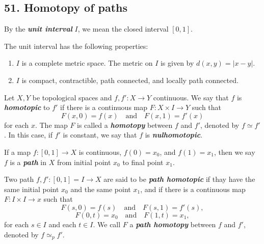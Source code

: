 \subsection{51. Homotopy of paths}

\begin{mydefinition}
By the \textbf{\emph{unit interval}} $I$, we mean the closed interval $[0,1]$. 
\end{mydefinition}

\begin{mytheorem}
The unit interval has the following properties:
\begin{enumerate}[label={(\alph*)}]
\item $I$ is a complete metric space. The metric on $I$ is given by $d(x,y)=|x-y|$.
\item $I$ is compact, contractible, path connected, and locally path connected.
\end{enumerate}
\end{mytheorem}

\begin{mydefinition}
[Homotopic]
Let $X,Y$ be topological spaces and $f,f':X\to Y$ continuous. We say that $f$ is \textbf{\emph{homotopic}} to $f'$ if there is a continuous map $F:X\times I\to Y$ such that
$$F(x,0)=f(x)\quad \text{and}\quad F(x,1)=f'(x)$$
for each $x$. The map $F$ is called a \textbf{\emph{homotopy}} between $f$ and $f'$, denoted by $f\simeq f'$. In this case, if $f'$ is constant, we say that $f$ is \textbf{\emph{nulhomotopic}}.
\end{mydefinition}
    
\begin{mydefinition}
[Path]
If a map $f:[0,1]\to X$ is continuous, $f(0)=x_0$, and $f(1)=x_1$, then we say $f$ is a \textbf{\emph{path}} in $X$ from initial point $x_0$ to final point $x_1$.
\end{mydefinition}
    
\begin{mydefinition}
Two path $f,f':[0,1]=I\to X$ are said to be \textbf{\emph{path homotopic}} if thay have the same initial point $x_0$ and the same point $x_1$, and if there is a continuous map $F:I\times I\to x$ such that
$$F(s,0)=f(s)\quad \text{and}\quad F(s,1)=f'(s),$$
$$F(0,t)=x_0\quad \text{and}\quad F(1,t)=x_1,$$
for each $s\in I$ and each $t\in I$. We call $F$ a \textbf{\emph{path homotopy}} between $f$ and $f'$, denoted by $f\simeq_p f'$.
\end{mydefinition}


